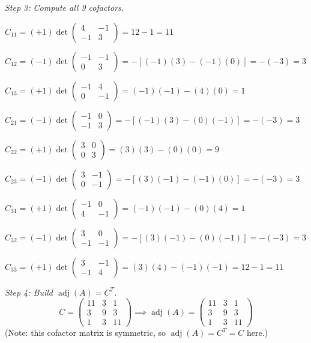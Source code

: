 \documentclass[12pt,a4paper]{article}
\begin{document}
\textit{Step 3: Compute all 9 cofactors.}

\(C_{11} = (+1)\det\begin{pmatrix}4&-1\\-1&3\end{pmatrix} = 12-1 = 11\)

\(C_{12} = (-1)\det\begin{pmatrix}-1&-1\\0&3\end{pmatrix} = -[(-1)(3)-(-1)(0)] = -(-3) = 3\)

\(C_{13} = (+1)\det\begin{pmatrix}-1&4\\0&-1\end{pmatrix} = (-1)(-1)-(4)(0) = 1\)

\(C_{21} = (-1)\det\begin{pmatrix}-1&0\\-1&3\end{pmatrix} = -[(-1)(3)-(0)(-1)] = -(-3) = 3\)

\(C_{22} = (+1)\det\begin{pmatrix}3&0\\0&3\end{pmatrix} = (3)(3)-(0)(0) = 9\)

\(C_{23} = (-1)\det\begin{pmatrix}3&-1\\0&-1\end{pmatrix} = -[(3)(-1)-(-1)(0)] = -(-3) = 3\)

\(C_{31} = (+1)\det\begin{pmatrix}-1&0\\4&-1\end{pmatrix} = (-1)(-1)-(0)(4) = 1\)

\(C_{32} = (-1)\det\begin{pmatrix}3&0\\-1&-1\end{pmatrix} = -[(3)(-1)-(0)(-1)] = -(-3) = 3\)

\(C_{33} = (+1)\det\begin{pmatrix}3&-1\\-1&4\end{pmatrix} = (3)(4)-(-1)(-1) = 12-1 = 11\)

\textit{Step 4: Build \(\operatorname{adj}(A) = C^{T}\).}
\[
C = \begin{pmatrix}11&3&1\\3&9&3\\1&3&11\end{pmatrix}
\implies
\operatorname{adj}(A) = \begin{pmatrix}11&3&1\\3&9&3\\1&3&11\end{pmatrix}
\]
(Note: this cofactor matrix is symmetric, so \(\operatorname{adj}(A)=C^{T}=C\) here.)
\end{document}
